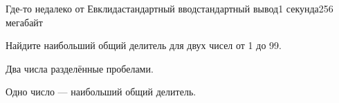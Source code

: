 \begin{problem}{Где-то недалеко от Евклида}{стандартный ввод}{стандартный вывод}{1 секунда}{256 мегабайт}

Найдите наибольший общий делитель для двух чисел от 1 до 99.

\InputFile
Два числа разделённые пробелами.

\OutputFile
Одно число --- наибольший общий делитель.

\Example

\begin{example}
%
\end{example}

\end{problem}

